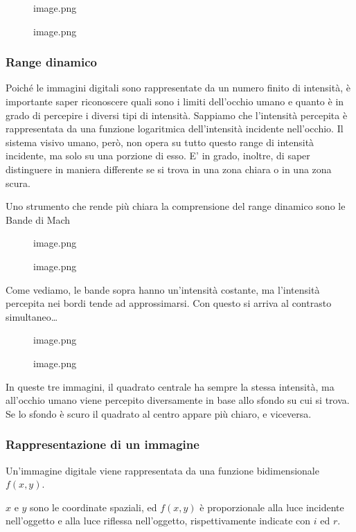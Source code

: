 \documentclass[
]{article}
\begin{document}
\begin{figure}
\centering
{image.png}
\caption{image.png}
\end{figure}

\hypertarget{range-dinamico}{%
\subsubsection{Range dinamico}\label{range-dinamico}}

Poiché le immagini digitali sono rappresentate da un numero finito di intensità, è importante saper riconoscere quali sono i limiti dell'occhio umano e quanto è in grado di percepire i diversi tipi di intensità.
Sappiamo che l'intensità percepita è rappresentata da una funzione logaritmica dell'intensità incidente nell'occhio. Il sistema visivo umano, però, non opera su tutto questo range di intensità incidente, ma solo su una porzione di esso. E' in grado, inoltre, di saper distinguere in maniera differente se si trova in una zona chiara o in una zona scura.

Uno strumento che rende più chiara la comprensione del range dinamico sono le Bande di Mach

\begin{figure}
\centering
{image.png}
\caption{image.png}
\end{figure}

Come vediamo, le bande sopra hanno un'intensità costante, ma l'intensità percepita nei bordi tende ad approssimarsi.
Con questo si arriva al contrasto simultaneo\ldots{}

\begin{figure}
\centering
{image.png}
\caption{image.png}
\end{figure}

In queste tre immagini, il quadrato centrale ha sempre la stessa intensità, ma all'occhio umano viene percepito diversamente in base allo sfondo su cui si trova. Se lo sfondo è scuro il quadrato al centro appare più chiaro, e viceversa.

\hypertarget{rappresentazione-di-un-immagine}{%
\subsubsection{Rappresentazione di un immagine}\label{rappresentazione-di-un-immagine}}

Un'immagine digitale viene rappresentata da una funzione bidimensionale \(f(x,y)\).

\(x\) e \(y\) sono le coordinate spaziali, ed \(f(x,y)\) è proporzionale alla luce incidente nell'oggetto e alla luce riflessa nell'oggetto, rispettivamente indicate con \(i\) ed \(r\).
\end{document}
